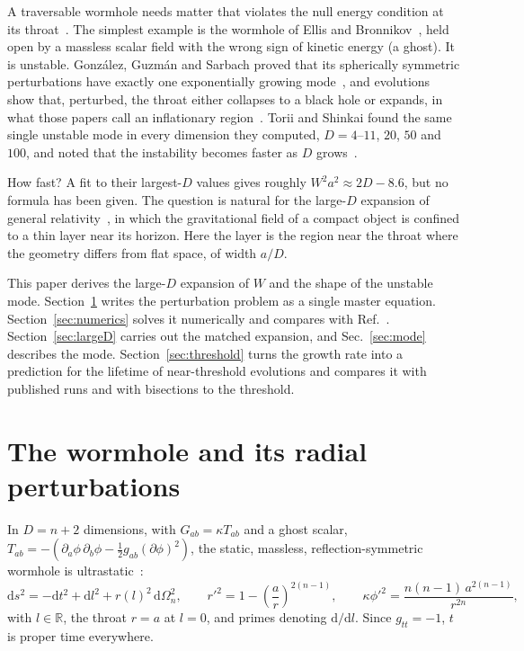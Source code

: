 \documentclass[11pt]{article}
\theoremstyle{remark}
\newcommand{\dd}{\mathrm{d}}
\begin{document}
A traversable wormhole needs matter that violates the null energy condition at its throat~\cite{MT1988}. The
simplest example is the wormhole of Ellis and Bronnikov~\cite{Ellis1973,Bronnikov1973}, held open by a massless scalar
field with the wrong sign of kinetic energy (a ghost). It is unstable. González, Guzmán and Sarbach proved that its
spherically symmetric perturbations have exactly one exponentially growing mode~\cite{GGS2009a}, and evolutions show
that, perturbed, the throat either collapses to a black hole or expands, in what those papers call an inflationary
region~\cite{SH2002,GGS2009b}.
Torii and Shinkai found the same single unstable mode in every dimension they computed, $D=4$--$11$, $20$, $50$ and
$100$, and noted that the instability becomes faster as $D$ grows~\cite{TS2013}.

How fast? A fit to their largest-$D$ values gives roughly $W^2a^2\approx2D-8.6$, but no formula has been given. The question is
natural for the large-$D$ expansion of general relativity~\cite{EST2013}, in which the gravitational field of a compact
object is confined to a thin layer near its horizon. Here the layer is the region near the throat where the geometry
differs from flat space, of width $a/D$.

This paper derives the large-$D$ expansion of $W$ and the shape of the unstable mode. Section~\ref{sec:setup} writes
the perturbation problem as a single master equation. Section~\ref{sec:numerics} solves it numerically and compares with
Ref.~\cite{TS2013}. Section~\ref{sec:largeD} carries out the matched expansion, and Sec.~\ref{sec:mode} describes the
mode. Section~\ref{sec:threshold} turns the growth rate into a prediction for the lifetime of near-threshold
evolutions and compares it with published runs and with bisections to the threshold.

\section{The wormhole and its radial perturbations}\label{sec:setup}

In $D=n+2$ dimensions, with $G_{ab}=\kappa T_{ab}$ and a ghost scalar,
$T_{ab}=-\left(\partial_a\phi\,\partial_b\phi-\tfrac12 g_{ab}(\partial\phi)^2\right)$, the static, massless,
reflection-symmetric wormhole is ultrastatic~\cite{TS2013}:
\begin{equation}
\dd s^2=-\dd t^2+\dd l^2+r(l)^2\,\dd\Omega_n^2,\qquad r'^2=1-\left(\frac{a}{r}\right)^{2(n-1)},\qquad
\kappa\phi'^2=\frac{n(n-1)\,a^{2(n-1)}}{r^{2n}},\label{eq:bg}
\end{equation}
with $l\in\mathbb R$, the throat $r=a$ at $l=0$, and primes denoting $\dd/\dd l$. Since $g_{tt}=-1$, $t$ is proper time
everywhere.
\end{document}
